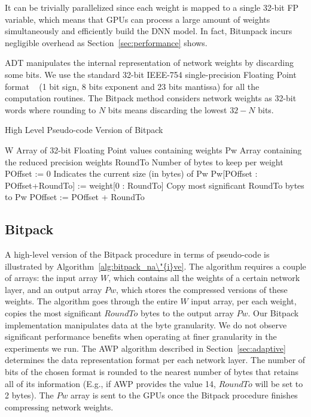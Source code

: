 It can be trivially parallelized since each weight is mapped
to a single 32-bit FP variable, which means that GPUs can process a
large amount of weights simultaneously and efficiently build the DNN model.
In fact, Bitunpack incurs negligible overhead as Section~\ref{sec:performance} shows.

ADT manipulates the internal representation of network weights by discarding some bits.
We use the standard 32-bit IEEE-754 single-precision Floating Point format
~\cite{ieee754} (1 bit sign, 8 bits exponent and 23 bits mantissa) for all the computation routines.
The Bitpack method considers network weights as 32-bit 
words where rounding to $N$ bits means discarding the lowest $32-N$ bits.

\begin{algorithm}%
\caption{High Level Pseudo-code Version of Bitpack}
\label{alg:bitpack_na\"{i}ve}
{\fontsize{9}{9}\selectfont
\begin{algorithmic}[1]
    \State W
    \Comment Array of 32-bit Floating Point values containing weights
    \State Pw
    \Comment Array containing the reduced precision weights
    \State RoundTo
    \Comment Number of bytes to keep per weight
    \State POffset := 0
    \Comment Indicates the current size (in bytes) of Pw
        \State Pw[POffset : POffset+RoundTo] := weight[0 : RoundTo]
        \Comment Copy most significant RoundTo bytes to Pw
        \State POffset := POffset + RoundTo
    \EndFor
\end{algorithmic}
}
\end{algorithm}


\subsection{Bitpack}
\label{subsec:bitpack}
A high-level version of the Bitpack procedure in terms of pseudo-code is illustrated by 
Algorithm~\ref{alg:bitpack_na\"{i}ve}.
The algorithm requires a couple of arrays: the input array $W$, which contains all the weights of a certain network layer, and an 
output array $Pw$, which stores the compressed versions of these weights. 
The algorithm goes through 
the entire $W$ input array, per each weight, copies the most 
significant $RoundTo$ bytes to the output array $Pw$.
Our Bitpack implementation manipulates data at the byte granularity.
We do not observe significant performance benefits when operating at finer granularity in the experiments we run.
The AWP algorithm described in Section~\ref{sec:adaptive} determines the data representation format per each network layer.  
The number of bits of the chosen format is rounded to the nearest number of bytes
that retains all of its information (E.g., if AWP provides the value 14, $RoundTo$ will be set to 2 bytes).
The $Pw$ array is sent to the GPUs once the Bitpack procedure finishes compressing network weights.

